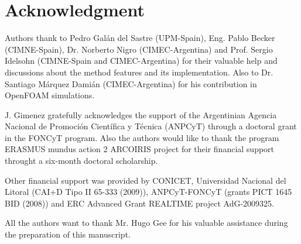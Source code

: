 \documentclass[review]{elsarticle}
\begin{document}
\section*{Acknowledgment}

Authors thank to Pedro Gal\'an del Sastre (UPM-Spain), Eng. Pablo Becker (CIMNE-Spain), Dr. Norberto Nigro (CIMEC-Argentina) and Prof. Sergio Idelsohn (CIMNE-Spain and CIMEC-Argentina) for their valuable help and discussions about the method features and its implementation. Also to Dr. Santiago M\'arquez Dami\'an (CIMEC-Argentina) for his contribution in OpenFOAM simulations.

J. Gimenez gratefully acknowledges the support of the Argentinian Agencia Nacional de Promoci\'on Cient\'ifica y T\' ecnica (ANPCyT) through a doctoral grant in the FONCyT program. Also the authors would like to thank the program ERASMUS mundus action 2 ARCOIRIS project for their financial support throught a six-month doctoral scholarship.

Other financial support was provided by CONICET, Universidad Nacional del Litoral (CAI+D Tipo II 65-333 (2009)), ANPCyT-FONCyT (grants PICT 1645 BID (2008)) and ERC Advanced Grant REALTIME project AdG-2009325.

All the authors want to thank Mr. Hugo Gee for his valuable assistance during the preparation of this manuscript.



\end{document}
